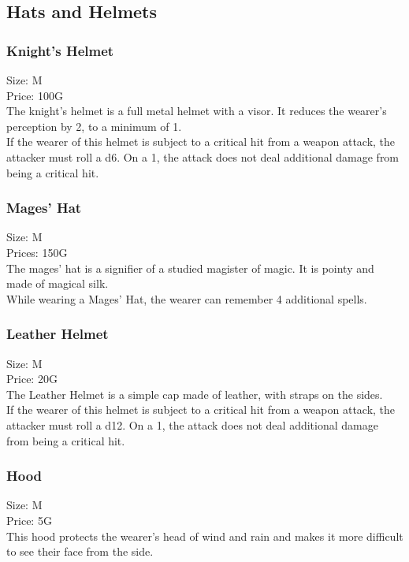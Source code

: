 \subsection{Hats and Helmets}\label{subsec:helmets}

\subsubsection{Knight's Helmet}\label{item:knightHelment}
Size: M\\
Price: 100G\\
The knight's helmet is a full metal helmet with a visor.
It reduces the wearer's perception by 2, to a minimum of 1.\\
If the wearer of this helmet is subject to a critical hit from a weapon attack, the attacker must roll a d6.
On a 1, the attack does not deal additional damage from being a critical hit.\\

\subsubsection{Mages' Hat}\label{item:mageHat}
Size: M\\
Prices: 150G\\
The mages' hat is a signifier of a studied magister of magic.
It is pointy and made of magical silk.\\
While wearing a Mages' Hat, the wearer can remember 4 additional spells.\\

\subsubsection{Leather Helmet}\label{item:leatherHelmet}
Size: M\\
Price: 20G\\
The Leather Helmet is a simple cap made of leather, with straps on the sides.\\
If the wearer of this helmet is subject to a critical hit from a weapon attack, the attacker must roll a d12.
On a 1, the attack does not deal additional damage from being a critical hit.\\

\subsubsection{Hood}\label{item:hood}
Size: M\\
Price: 5G\\
This hood protects the wearer's head of wind and rain and makes it more difficult to see their face from the side.\\


